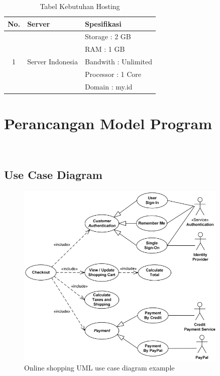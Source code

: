 \begin{table}[H]
	\centering
	\caption{Tabel Kebutuhan Hosting}
	\begin{tabular}{ | c | l | l | }
		\hline
		No. & Server & Spesifikasi \\
		\hline
		\multirow{5}{*}{1} & \multirow{5}{*}{Server Indonesia} & Storage : 2 GB \\
		& & RAM : 1 GB \\
		& & Bandwith : Unlimited \\
		& & Processor : 1 Core \\
		& & Domain : my.id  \\
	
		\hline
	\end{tabular}
\end{table}

\section{Perancangan Model Program}
\blindtext \\

\subsection{Use Case Diagram}

\begin{figure}
	\centering
	\includegraphics[width=0.9\textwidth]
	{pics/use-case-example.png}
	\caption{Online shopping UML use case diagram example}
	\label{fig:32}
\end{figure}

